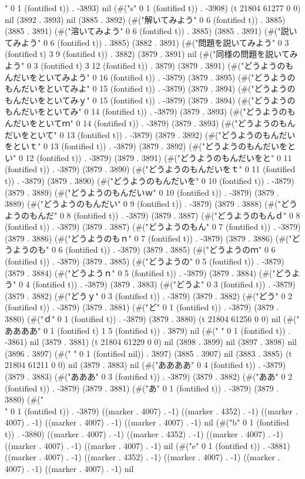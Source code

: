 " 0 1 (fontified t)) . -3893) nil (#("s" 0 1 (fontified t)) . -3908) (t 21804 61277 0 0) nil (3892 . 3893) nil (3885 . 3892) (#("解いてみよう" 0 6 (fontified t)) . 3885) (3885 . 3891) (#("溶いてみよう" 0 6 (fontified t)) . 3885) (3885 . 3891) (#("説いてみよう" 0 6 (fontified t)) . 3885) (3882 . 3891) (#("問題を説いてみよう" 0 3 (fontified t) 3 9 (fontified t)) . 3882) (3879 . 3891) nil (#("同様の問題を説いてみよう" 0 3 (fontified t) 3 12 (fontified t)) . 3879) (3879 . 3891) (#("どうようのもんだいをといてみよう" 0 16 (fontified t)) . -3879) (3879 . 3895) (#("どうようのもんだいをといてみよ" 0 15 (fontified t)) . -3879) (3879 . 3894) (#("どうようのもんだいをといてみｙ" 0 15 (fontified t)) . -3879) (3879 . 3894) (#("どうようのもんだいをといてみ" 0 14 (fontified t)) . -3879) (3879 . 3893) (#("どうようのもんだいをといてｍ" 0 14 (fontified t)) . -3879) (3879 . 3893) (#("どうようのもんだいをといて" 0 13 (fontified t)) . -3879) (3879 . 3892) (#("どうようのもんだいをといｔ" 0 13 (fontified t)) . -3879) (3879 . 3892) (#("どうようのもんだいをとい" 0 12 (fontified t)) . -3879) (3879 . 3891) (#("どうようのもんだいをと" 0 11 (fontified t)) . -3879) (3879 . 3890) (#("どうようのもんだいをｔ" 0 11 (fontified t)) . -3879) (3879 . 3890) (#("どうようのもんだいを" 0 10 (fontified t)) . -3879) (3879 . 3889) (#("どうようのもんだいｗ" 0 10 (fontified t)) . -3879) (3879 . 3889) (#("どうようのもんだい" 0 9 (fontified t)) . -3879) (3879 . 3888) (#("どうようのもんだ" 0 8 (fontified t)) . -3879) (3879 . 3887) (#("どうようのもんｄ" 0 8 (fontified t)) . -3879) (3879 . 3887) (#("どうようのもん" 0 7 (fontified t)) . -3879) (3879 . 3886) (#("どうようのもｎ" 0 7 (fontified t)) . -3879) (3879 . 3886) (#("どうようのも" 0 6 (fontified t)) . -3879) (3879 . 3885) (#("どうようのｍ" 0 6 (fontified t)) . -3879) (3879 . 3885) (#("どうようの" 0 5 (fontified t)) . -3879) (3879 . 3884) (#("どうようｎ" 0 5 (fontified t)) . -3879) (3879 . 3884) (#("どうよう" 0 4 (fontified t)) . -3879) (3879 . 3883) (#("どうよ" 0 3 (fontified t)) . -3879) (3879 . 3882) (#("どうｙ" 0 3 (fontified t)) . -3879) (3879 . 3882) (#("どう" 0 2 (fontified t)) . -3879) (3879 . 3881) (#("ど" 0 1 (fontified t)) . -3879) (3879 . 3880) (#("ｄ" 0 1 (fontified t)) . -3879) (3879 . 3880) (t 21804 61256 0 0) nil (#(" ああああ" 0 1 (fontified t) 1 5 (fontified t)) . 3879) nil (#(" " 0 1 (fontified t)) . -3861) nil (3879 . 3881) (t 21804 61229 0 0) nil (3898 . 3899) nil (3897 . 3898) nil (3896 . 3897) (#(" " 0 1 (fontified nil)) . 3897) (3885 . 3907) nil (3883 . 3885) (t 21804 61211 0 0) nil (3879 . 3883) nil (#("ああああ" 0 4 (fontified t)) . -3879) (3879 . 3883) (#("あああ" 0 3 (fontified t)) . -3879) (3879 . 3882) (#("ああ" 0 2 (fontified t)) . -3879) (3879 . 3881) (#("あ" 0 1 (fontified t)) . -3879) (3879 . 3880) (#("\\" 0 1 (fontified t)) . -3879) ((marker . 4007) . -1) ((marker . 4352) . -1) ((marker . 4007) . -1) ((marker . 4007) . -1) ((marker . 4007) . -1) nil (#("b" 0 1 (fontified t)) . -3880) ((marker . 4007) . -1) ((marker . 4352) . -1) ((marker . 4007) . -1) ((marker . 4007) . -1) ((marker . 4007) . -1) nil (#("e" 0 1 (fontified t)) . -3881) ((marker . 4007) . -1) ((marker . 4352) . -1) ((marker . 4007) . -1) ((marker . 4007) . -1) ((marker . 4007) . -1) nil 